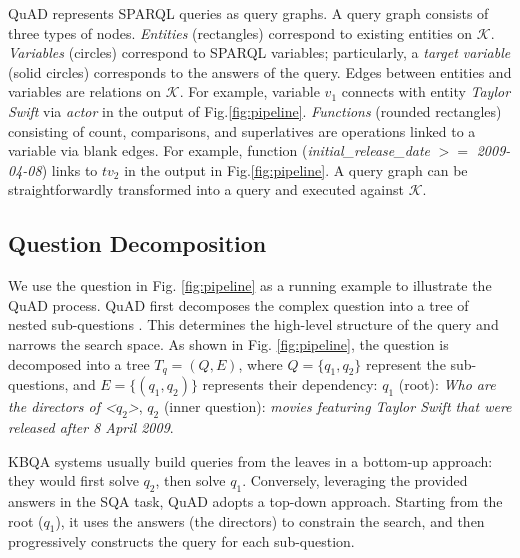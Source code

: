 \documentclass[runningheads]{llncs}
\begin{document}
QuAD represents SPARQL queries as query graphs. 
A query graph consists of three types of nodes. \textit{Entities} (rectangles) correspond to existing entities on $\mathcal{K}$. \textit{Variables} (circles) correspond to SPARQL variables; particularly, a \textit{target variable} (solid circles) corresponds to the answers of the query. Edges between entities and variables are relations on $\mathcal{K}$. For example, variable $v_1$ connects with entity \textit{Taylor Swift} via \textit{actor} in the output of Fig.\ref{fig:pipeline}. 
\textit{Functions} (rounded rectangles) consisting of count, comparisons, and superlatives are operations linked to a variable via blank edges. For example, function (\textit{initial\_release\_date} $>=$ \textit{2009-04-08}) links to $tv_2$ in the output in Fig.\ref{fig:pipeline}. 
A query graph can be straightforwardly transformed into a query and executed against $\mathcal{K}$.

\subsection{Question Decomposition}\label{subsec:query decompostion}
We use the question in Fig. \ref{fig:pipeline} as a running example to illustrate the QuAD process.
QuAD first decomposes the complex question into a tree of nested sub-questions \cite{huang2023qdt}. This determines the high-level structure of the query and narrows the search space.
As shown in Fig. \ref{fig:pipeline}, the question is decomposed into a tree $T_q = (Q, E)$, where $Q=\{q_1, q_2\}$ represent the sub-questions, and $E=\{(q_1, q_2)\}$ represents their dependency: $q_1$ (root): \textit{Who are the directors of <$q_2$>}, $q_2$ (inner question): \textit{movies featuring Taylor Swift that were released after 8 April 2009}.

KBQA systems usually build queries from the leaves in a bottom-up approach: they would first solve $q_2$, then solve $q_1$. 
Conversely, leveraging the provided answers in the SQA task, QuAD adopts a top-down approach. Starting from the root ($q_1$), it uses the answers (the directors) to constrain the search, and then progressively constructs the query for each sub-question.
\end{document}
